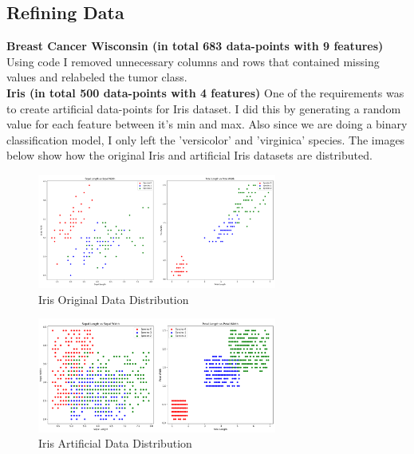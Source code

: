 \documentclass{article}
\begin{document}
        \subsection*{Refining Data}
            \textbf{Breast Cancer Wisconsin (in total 683 data-points with 9  features)}
            Using code I removed unnecessary columns and rows that contained missing values and relabeled the tumor class. \\
            \textbf{Iris (in total 500 data-points with 4 features)}
            One of the requirements was to create artificial data-points for Iris dataset. I did this by generating a random value for each feature between it's min and max. Also since we are doing a binary classification model, I only left the 'versicolor' and 'virginica' species. The images below show how the original Iris and artificial Iris datasets are distributed.
            \begin{figure}[H]
                \centering
                \includegraphics[width=0.7\textwidth]{iris.png}
                \caption{Iris Original Data Distribution}
            \end{figure}
            \begin{figure}[H]
                \centering
                \includegraphics[width=0.7\textwidth]{iris-combined.png}
                \caption{Iris Artificial Data Distribution}
            \end{figure}
\end{document}

